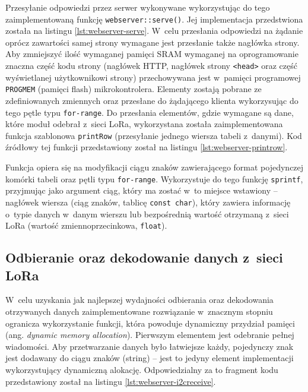 

\FloatBarrier
Przesyłanie odpowiedzi przez serwer wykonywane wykorzystując do tego zaimplementowaną funkcję
\texttt{webserver::serve()}. Jej implementacja przedstwiona została na listingu \ref{lst:webserver-serve}. W~celu
przesłania odpowiedzi na żądanie oprócz zawartości samej strony wymagane jest przesłanie także nagłówka strony. Aby
zmniejszyć ilość wymaganej pamięci SRAM wymaganej na oprogramowanie znaczna część kodu strony (nagłówek HTTP, nagłówek
strony \texttt{<head>} oraz część wyświetlanej użytkownikowi strony) przechowywana jest w~pamięci programowej
\texttt{PROGMEM} (pamięci flash) mikrokontrolera. Elementy zostają pobrane ze zdefiniowanych zmiennych oraz przesłane do
żądającego klienta wykorzysując do tego pętle typu \texttt{for-range}. Do przesłania elementów, gdzie wymagane są dane,
które moduł odebrał z~sieci LoRa, wykorzystana została zaimplementowana funkcja szablonowa \texttt{printRow}
(przesyłanie jednego wiersza tabeli z~danymi). Kod źródłowy tej funkcji przedstawiony został na listingu
\ref{lst:webserver-printrow}.





\FloatBarrier
Funkcja opiera się na modyfikacji ciągu znaków zawierającego format pojedynczej komórki tabeli oraz pętli typu
\texttt{for-range}. Wykorzystuje do tego funkcję \texttt{sprintf}, przyjmując jako argument ciąg, który ma zostać w~to
miejsce wstawiony -- nagłówek wiersza (ciąg znaków, tablicę \texttt{const char}), który zawiera informację o~typie
danych w~danym wierszu lub bezpośrednią wartość otrzymaną z~sieci LoRa (wartość zmiennoprzecinkowa, \texttt{float}).

\FloatBarrier
\subsection{\label{sect:webserver-i2cdecode}Odbieranie oraz dekodowanie danych z~sieci LoRa} W~celu
uzyskania jak najlepszej wydajności odbierania oraz dekodowania otrzywanych danych zaimplementowane rozwiązanie
w~znacznym stopniu ogranicza wykorzystanie funkcji, która powoduje dynamiczny przydział pamięci (ang. \textsl{dynamic
    memory allocation}). Pierwszym elementem jest odebranie pełnej wiadomości. Aby przetwarzanie danych było łatwiejsze
każdy, pojedynczy znak jest dodawany do ciągu znaków (string) -- jest to jedyny element implementacji wykorzystujący
dynamiczną alokację. Odpowiedzialny za to fragment kodu przedstawiony został na listingu \ref{lst:webserver-i2creceive}.

